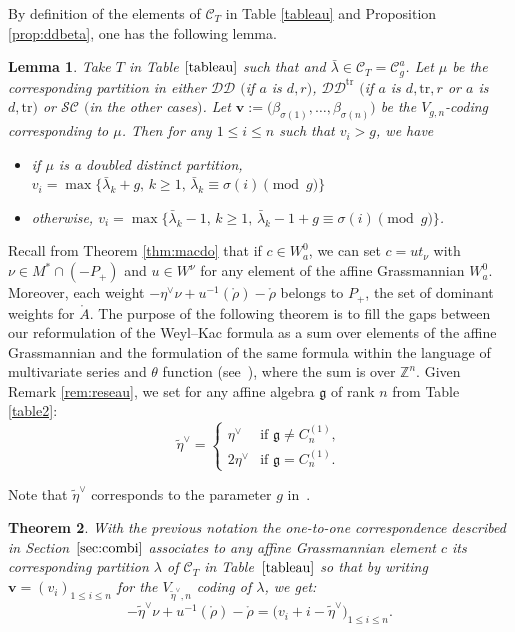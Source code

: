 \documentclass[pdftex]{sigma}
\newtheorem{Theorem}{Theorem}[section]
\newtheorem{Lemma}[Theorem]{Lemma}
\numberwithin{equation}{section}
\newcommand{\cC}{\mathcal{C}}
\def\ccsc{\mathcal {SC}}
\def\ccdd{\mathcal {DD}}
\newcommand{\Z}{\mathbb{Z}}
\begin{document}
By definition of the elements of $\cC_T$ in Table \ref{tableau} and Proposition \ref{prop:ddbeta}, one has the following lemma.

\begin{Lemma}%
Take $T$ in Table $\ref{tableau}$ such that  and $\bar{\lambda}\in\cC_T=\cC_{g}^{a}$. Let $\mu$ be the corresponding partition in either $\ccdd$ $($if $a$ is $d,r)$, $\ccdd^{\mathrm{tr}}$ $($if $a$ is $d,\mathrm{tr},r$ or $a$ is $d,\mathrm{tr})$ or $\ccsc$ $($in the other cases$)$. Let $\mathbf{v}:=\bigl(\beta_{\sigma(1)},\dots,\beta_{\sigma(n)}\bigr)$ be the $V_{g,n}$-coding corresponding to $\mu$. Then for any $1\leq i\leq n$ such that $v_i>g$, we have
\begin{itemize}\itemsep=0pt
\item if $\mu$ is a doubled distinct partition, $v_i=\max\bigl\lbrace \bar{\lambda}_k+g,\, k\geq 1,\,\bar{\lambda}_k\equiv \sigma(i)\pmod{g} \bigr\rbrace$
\item otherwise, $v_i=\max\lbrace \bar{\lambda}_k-1,\, k\geq 1,\,\bar{\lambda}_k-1+g\equiv \sigma(i)\pmod{g} \rbrace$.

\end{itemize}
\end{Lemma}

Recall from Theorem \ref{thm:macdo} that if $c\in W_{a}^{0}$, we can set $c=ut_{\nu}$ with $\nu\in M^{*}\cap(-P_{+})$ and $u\in W^{\nu}$ for
any element of the affine Grassmannian $W_{a}^{0}$. Moreover, each weight $%
-\eta^{\vee}\nu+u^{-1}(\mathring{\rho})-\mathring{\rho}$ belongs to $P_{+}$,
the set of dominant weights for $\mathring{A}$. The purpose of the following theorem is to fill the gaps between our reformulation of the Weyl--Kac formula as a sum over elements of the affine Grassmannian and the formulation of the same formula within the language of multivariate series and $\theta$ function (see~\cite[Proposition $6.1$]{RS}), where the sum is over $\Z^n$. Given Remark \ref{rem:reseau}, we set for any affine algebra $\mathfrak{g}$ of rank $n$ from Table \ref{table2}:
\[\tilde{\eta}^{\vee}=\begin{cases} \eta^{\vee} &\text{if } \mathfrak{g}\neq C_n^{(1)},\\
2 \eta^{\vee} &\text{if } \mathfrak{g}= C_n^{(1)}.\end{cases}\]

Note that $\tilde{\eta}^{\vee}$ corresponds to the parameter $g$ in~\cite{Mac,Wmac}.


\begin{Theorem}%
With the previous notation the one-to-one correspondence described in Section~$\ref{sec:combi}$ associates to any affine Grassmannian element $c$ its corresponding partition $\lambda$ of $\cC_T$ in Table~$\ref{tableau}$ so that by writing $\mathbf{v}=(v_i)_{1\leq i\leq n}$ for the $V_{\tilde{\eta}^{\vee},n}$ coding of $\lambda$, we get:
\[-\tilde{\eta}^{\vee}\nu+u^{-1}(\mathring{\rho})-\mathring{\rho}=\bigl(v_i+i-\tilde{\eta}^{\vee}\bigr)_{1\leq i\leq n}.\]
\end{Theorem}
\end{document}
